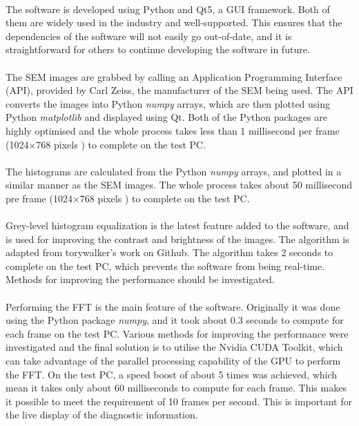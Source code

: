 \documentclass[12pt,a4paper]{article}
\begin{document}
\paragraph{}
The software is developed using Python and Qt5, a GUI framework. Both of them are widely used in the industry and well-supported. This ensures that the dependencies of the software will not easily go out-of-date, and it is straightforward for others to continue developing the software in future.

\paragraph{}
The SEM images are grabbed by calling an Application Programming Interface (API), provided by Carl Zeiss, the manufacturer of the SEM being used. The API converts the images into Python \textit{numpy} arrays, which are then plotted using Python \textit{matplotlib} and displayed using Qt. Both of the Python packages are highly optimised and the whole process takes less than 1 millisecond per frame (1024$\times$768 pixels ) to complete on the test PC.

\paragraph{}
The histograms are calculated from the Python \textit{numpy} arrays, and plotted in a similar manner as the SEM images. The whole process takes about 50 millisecond pre frame (1024$\times$768 pixels ) to complete on the test PC.

\paragraph{}
Grey-level histogram equalization is the latest feature added to the software, and is used for improving the contrast and brightness of the images. The algorithm is adapted from torywalker's work on Github. The algorithm takes 2 seconds to complete on the test PC, which prevents the software from being real-time. Methods for improving the performance should be investigated.

\paragraph{}
Performing the FFT is the main feature of the software. Originally it was done using the Python package \textit{numpy}, and it took about 0.3 seconds to compute for each frame on the test PC. Various methods for improving the performance were investigated and the final solution is to utilise the Nvidia CUDA Toolkit, which can take advantage of the parallel processing capability of the GPU to perform the FFT. On the test PC, a speed boost of about 5 times was  achieved, which mean it takes only about 60 milliseconds to compute for each frame. This makes it possible to meet the requirement of 10 frames per second. This is important for the live display of the diagnostic information.
\end{document}
